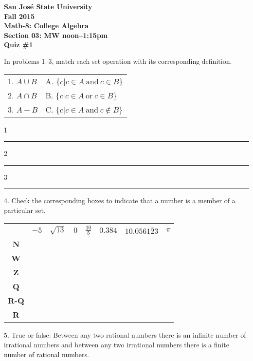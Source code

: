 \documentclass[letterpaper, 12pt]{article}
\begin{document}
\begin{center}
\bfseries
San Jos\'{e} State University \\
Fall 2015 \\
Math-8: College Algebra \\
Section 03: MW noon--1:15pm \\
\bigskip
Quiz \#1
\end{center}

\bigskip

In problems 1--3, match each set operation with its corresponding definition.

\bigskip

\begin{tabular}{p{2in}l}
1. $A \cup B$ & A. $\{c | c \in A\ \mbox{and}\ c \in B\}$ \\
2. $A \cap B$ & B. $\{c | c \in A\ \mbox{or}\ c \in B\}$ \\
3. $A - B$ & C. $\{c | c \in A\ \mbox{and}\ c \notin B\}$
\end{tabular}

\bigskip

1 \rule{1in}{1pt}

2 \rule{1in}{1pt}

3 \rule{1in}{1pt}

\vspace{0.5in}

4. Check the corresponding boxes to indicate that a number is a member of a
particular set.

\bigskip

\begin{tabular}{|c|c|c|c|c|c|c|c|}
\hline
& $-5$ & $\sqrt{13}$ & $0$ & $\frac{10}{5}$ & $0.384$ & $10.056\overline{123}$
  & $\pi$ \\
\hline
\textbf{N} & & & & & & & \\
\hline
\textbf{W} & & & & & & & \\
\hline
\textbf{Z} & & & & & & & \\
\hline
\textbf{Q} & & & & & & & \\
\hline
\textbf{R-Q} & & & & & & & \\
\hline
\textbf{R} & & & & & & & \\
\hline
\end{tabular}

\vspace{0.5in}

5. True or false: Between any two rational numbers there is an infinite number
of irrational numbers and between any two irrational numbers there is a finite
number of rational numbers.
\end{document}
